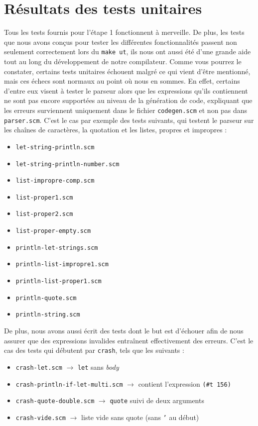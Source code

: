 \documentclass[12pt]{article}
\begin{document}
\section{Résultats des tests unitaires}
Tous les tests fournis pour l'étape 1 fonctionnent à merveille. De plus, les tests que nous avons conçus pour tester les différentes fonctionnalités passent non seulement correctement lors du \texttt{make ut}, ils nous ont aussi été d'une grande aide tout au long du développement de notre compilateur. Comme vous pourrez le constater, certains tests unitaires échouent malgré ce qui vient d'être mentionné, mais ces échecs sont normaux au point où nous en sommes. En effet, certains d'entre eux visent à tester le parseur alors que les expressions qu'ils contiennent ne sont pas encore supportées au niveau de la génération de code, expliquant que les erreurs surviennent uniquement dans le fichier \texttt{codegen.scm} et non pas dans \texttt{parser.scm}. C'est le cas par exemple des tests suivants, qui testent le parseur sur les chaînes de caractères, la quotation et les listes, propres et impropres :

\begin{itemize}
\item \texttt{let-string-println.scm}
\item \texttt{let-string-println-number.scm}
\item \texttt{list-impropre-comp.scm}
\item \texttt{list-proper1.scm}
\item \texttt{list-proper2.scm}
\item \texttt{list-proper-empty.scm}
\item \texttt{println-let-strings.scm}
\item \texttt{println-list-impropre1.scm}
\item \texttt{println-list-proper1.scm}
\item \texttt{println-quote.scm}
\item \texttt{println-string.scm}
\end{itemize}

De plus, nous avons aussi écrit des tests dont le but est d'échouer afin de nous assurer que des expressions invalides entraînent effectivement des erreurs. C'est le cas des tests qui débutent par \texttt{crash}, tels que les suivants :

\begin{itemize}
\item \texttt{crash-let.scm} $\rightarrow$ \texttt{let} sans \textit{body}
\item \texttt{crash-println-if-let-multi.scm} $\rightarrow$ contient l'expression \texttt{(\#t 156)}
\item \texttt{crash-quote-double.scm} $\rightarrow$ \texttt{quote} suivi de deux arguments
\item \texttt{crash-vide.scm} $\rightarrow$ liste vide sans quote (sans \texttt{'} au début)
\end{itemize}
\end{document}
